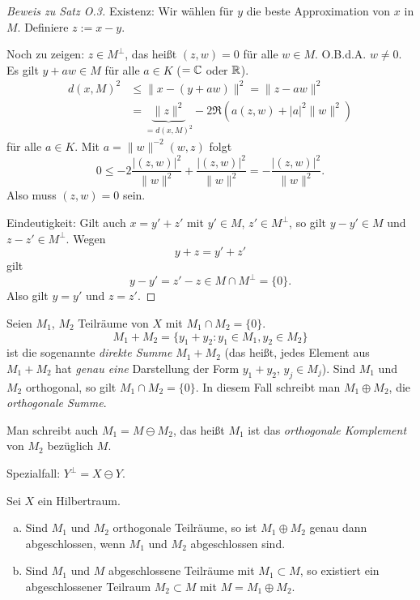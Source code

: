 \begin{proof}[Beweis zu Satz O.3]
  Existenz: Wir wählen für $y$ die beste Approximation von $x$ in $M$. Definiere
  $z := x - y$.

  Noch zu zeigen: $z \in M^\perp$, das heißt $(z,w) = 0$ für alle $w \in M$.
  O.B.d.A. $w \ne 0$. Es gilt $y + aw \in M$ für alle $a \in K$ ($=\mathbb{C}$
  oder $\mathbb{R}$).
  \begin{align*}
    d(x,M)^2
    &\le \| x - (y+aw) \|^2 = \| z - aw \|^2 \\
    &= \underbrace{\| z \|^2}_{=d(x,M)^2} - 2 \Re( a(z,w) + |a|^2 \|w\|^2 )
  \end{align*}
  für alle $a \in K$. Mit $a = \| w \|^{-2} (w,z)$ folgt
  \[ 0 \le -2 \frac{|(z,w)|^2}{\|w\|^2} + \frac{|(z,w)|^2}{\|w\|^2}
    = - \frac{|(z,w)|^2}{\|w\|^2}. \]
  Also muss $(z,w) = 0$ sein.

  Eindeutigkeit: Gilt auch $x = y' + z'$ mit $y' \in M$, $z' \in M^\perp$, so
  gilt $y - y' \in M$ und $z - z' \in M^\perp$. Wegen
  \[ y + z = y' + z' \]
  gilt
  \[ y - y' = z' - z \in M \cap M^\perp = \{ 0 \}. \]
  Also gilt $y = y'$ und $z = z'$.
\end{proof}

\begin{denos*}
  Seien $M_1$, $M_2$ Teilräume von $X$ mit $M_1 \cap M_2 = \{ 0 \}$.
  \[ M_1 + M_2 = \{ y_1 + y_2 : y_1 \in M_1, y_2 \in M_2 \} \]
  ist die sogenannte \emph{direkte Summe} $M_1 + M_2$ (das heißt, jedes Element
  aus $M_1 + M_2$ hat \emph{genau eine} Darstellung der Form $y_1 + y_2$, $y_j
  \in M_j$).
  Sind $M_1$ und $M_2$ orthogonal, so gilt $M_1 \cap M_2 = \{0\}$. In diesem
  Fall schreibt man $M_1 \oplus M_2$, die \emph{orthogonale Summe}.

  Man schreibt auch $M_1 = M \ominus M_2$, das heißt $M_1$ ist das
  \emph{orthogonale Komplement} von $M_2$ bezüglich $M$.

  Spezialfall: $Y^\perp = X \ominus Y$.
\end{denos*}

\clearpage

\begin{thm}
  Sei $X$ ein Hilbertraum.
  \begin{enumerate}[a)]
  \item Sind $M_1$ und $M_2$ orthogonale Teilräume, so ist $M_1 \oplus M_2$
    genau dann abgeschlossen, wenn $M_1$ und $M_2$ abgeschlossen sind.
  \item Sind $M_1$ und $M$ abgeschlossene Teilräume mit $M_1 \subset M$, so
    existiert ein abgeschlossener Teilraum $M_2 \subset M$ mit $M = M_1 \oplus
    M_2$. 
  \end{enumerate}
\end{thm}

